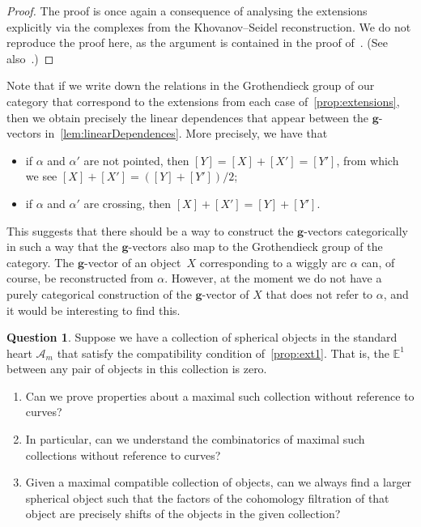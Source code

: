 \documentclass{amsart}
\theoremstyle{definition}
\newtheorem{question}[theorem]{Question}
\renewcommand{\b}[1]{{\boldsymbol{#1}}} %
\begin{document}
\begin{proof}
  The proof is once again a consequence of analysing the extensions explicitly via the complexes from the Khovanov--Seidel reconstruction.
  We do not reproduce the proof here, as the argument is contained in the proof of~\cite[Thm.~5.5]{tho:06}.
  (See also~\cite[Fig.~4]{tho:06}.)
\end{proof}
Note that if we write down the relations in the Grothendieck group of our category that correspond to the extensions from each case of~\cref{prop:extensions}, then we obtain precisely the linear dependences that appear between the \(\b{g}\)-vectors in~\cref{lem:linearDependences}.
More precisely, we have that
\begin{itemize}
\item if \(\alpha\) and \(\alpha'\) are not pointed, then
  \([Y] = [X] + [X'] = [Y']\),
  from which we see \([X] + [X'] = ([Y] + [Y'])/2\);
\item if \(\alpha\) and \(\alpha'\) are crossing, then
  \([X] + [X'] = [Y] + [Y'].\)
\end{itemize}
This suggests that there should be a way to construct the \(\b{g}\)-vectors categorically in such a way that the \(\b{g}\)-vectors also map to the Grothendieck group of the category.
The \(\b{g}\)-vector of an object~\(X\) corresponding to a wiggly arc \(\alpha\) can, of course, be reconstructed from \(\alpha\).
However, at the moment we do not have a purely categorical construction of the \(\b{g}\)-vector of \(X\) that does not refer to \(\alpha\), and it would be interesting to find this.

\begin{question}
  Suppose we have a collection of spherical objects in the standard heart \(\mathcal{A}_m\) that satisfy the compatibility condition of~\cref{prop:ext1}.
  That is, the \(\mathbb{E}^1\) between any pair of objects in this collection is zero.
  \begin{enumerate}
  \item Can we prove properties about a maximal such collection without reference to curves?
  \item In particular, can we understand the combinatorics of maximal such collections without reference to curves?
  \item Given a maximal compatible collection of objects, can we always find a larger spherical object such that the factors of the cohomology filtration of that object are precisely shifts of the objects in the given collection?
  \end{enumerate}
\end{question}
\end{document}
